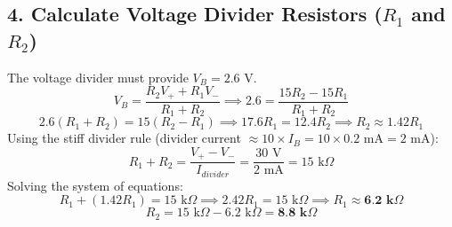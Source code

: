 \documentclass{article}
\begin{document}
\subsection*{4. Calculate Voltage Divider Resistors ($R_1$ and $R_2$)}
The voltage divider must provide $V_B = 2.6 \text{ V}$.
\[ V_{B} = \frac{R_2 V_+ + R_1 V_-}{R_1 + R_2} \implies 2.6 = \frac{15R_2 - 15R_1}{R_1 + R_2} \]
\[ 2.6(R_1 + R_2) = 15(R_2 - R_1) \implies 17.6 R_1 = 12.4 R_2 \implies R_2 \approx 1.42 R_1 \]
Using the stiff divider rule (divider current $\approx 10 \times I_B = 10 \times 0.2 \text{ mA} = 2 \text{ mA}$):
\[ R_1 + R_2 = \frac{V_+ - V_-}{I_{divider}} = \frac{30 \text{ V}}{2 \text{ mA}} = 15 \text{ k}\Omega \]
Solving the system of equations:
\[ R_1 + (1.42 R_1) = 15 \text{ k}\Omega \implies 2.42 R_1 = 15 \text{ k}\Omega \implies R_1 \approx \textbf{6.2 k}\Omega \]
\[ R_2 = 15 \text{ k}\Omega - 6.2 \text{ k}\Omega = \textbf{8.8 k}\Omega \]
\end{document}
